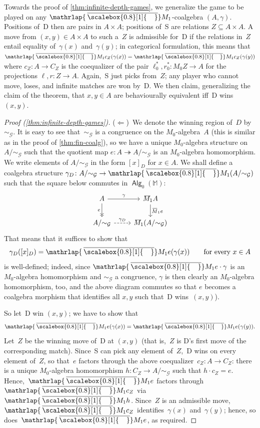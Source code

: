 \documentclass[sigconf,
			final%
			nonacm
                        ]{acmart}
\numberwithin{equation}{section}
\numberwithin{equation}{section}
\theoremstyle{plain}
\theoremstyle{definition}
\newcommand{\overbar}[1]{\mkern 1.5mu\overline{\mkern-2.5mu#1\mkern-1.5mu}\mkern 1.5mu}
\newcommand{\mybar}[3]{%
  \mathrlap{\hspace{#2}\overline{\scalebox{#1}[1]{\hphantom{\ensuremath{#3}}\vphantom{\rule{0pt}{5.5pt}}}}}\ensuremath{#3}
}
\newcommand{\infgameeq}{\sim_{\mathcal{G}}}
\newcommand{\barM}{\mybar{0.8}{2pt}{M}_1}
\newcommand{\epito}{\twoheadrightarrow}
\newcommand{\M}{\mathbb{M}}                   %
\DeclareMathOperator{\Alg}{\mathsf{Alg}}
\begin{document}
Towards the proof of \cref{thm:infinite-depth-games}, we generalize
the game to be played on any $\barM$-coalgebra $(A,\gamma)$. Positions
of~D then are pairs in $A\times A$; positions of~S are relations
$Z\subseteq A\times A$. A move from $(x,y)\in A \times A$ to such
a~$Z$ is admissible for~D if the relations in~$Z$ entail equality
of~$\gamma(x)$ and~$\gamma(y)$; in categorical formulation, this means
that $\barM c_Z(\gamma(x))=\barM c_Z(\gamma(y))$ where
$c_Z\colon A\to C_Z$ is the coequalizer of the pair
$\ell^*_0,r^*_0\colon M_0Z\to A$ for the projections
$\ell,r\colon Z\to A$. Again,~S just picks from~$Z$; any player who
cannot move, loses, and infinite matches are won by~D. We then claim,
generalizing the claim of the theorem, that $x,y\in A$ are
behaviourally equivalent iff~D wins $(x,y)$.

\begin{proof}[Proof (\cref{thm:infinite-depth-games})]
($\Leftarrow$)~We denote the winning region of~$D$ by $\infgameeq$. It is
easy to see that~$\infgameeq$ is a congruence on the $M_0$-algebra~$A$
(this is similar as in the proof of \cref{thm:fin-coalg}),%
so
we have a unique $M_0$-algebra structure on $A/{\infgameeq}$ such that the
quotient map $e\colon A\epito A/{\infgameeq}$ is an $M_0$-algebra
homomorphism. We write elements of $A/{\infgameeq}$ in the form $[x]_D$
for $x\in A$. We shall define a coalgebra structure $\gamma_D\colon
A/{\infgameeq} \to \barM(A/{\infgameeq})$ such that the square below commutes
in $\Alg_0(\M)$:
\[
  \begin{tikzcd}
    A \ar{r}{\gamma}
    \ar[->>]{d}[swap]{e}
    &
    \barM A
    \ar{d}{\overbar M_1 e}
    \\
    A/{\infgameeq}
    \ar[dashed]{r}{\gamma_D}
    &
    \barM(A/{\infgameeq})
  \end{tikzcd}
\]
That means that it suffices to show that
\begin{equation*}
  \gamma_D([x]_D) = \barM e(\gamma(x))\qquad
  \text{for every $x \in A$}
\end{equation*}
is well-defined; indeed, since $\barM e\cdot \gamma$ is an $M_0$-algebra
homomorphism and $\infgameeq$ a congruence, $\gamma$ is then clearly an
$M_0$-algebra homomorphism, too, and the above diagram commutes so
that $e$ becomes a coalgebra morphism that identifies all $x,y$ such
that~D wins~$(x,y)$).

So let~D win $(x,y)$; we have to show that
\[
  \barM e(\gamma(x))=\barM e(\gamma(y)).
\]
Let~$Z$ be the winning move of~D at $(x,y)$ (that is,~$Z$ is D's first
move of the corresponding match). Since~S can pick any element
of~$Z$,~D wins on every element of~$Z$, so that~$e$ factors through
the above coequalizer~$c_Z\colon A \to C_Z$: there is a unique
$M_0$-algebra homomorphism $h\colon C_Z \to A/{\infgameeq}$ such that
$h \cdot c_Z = e$. Hence,~$\barM e$ factors through~$\barM c_Z$ via
$\barM h$. Since~$Z$ is an admissible move, $\barM c_Z$
identifies~$\gamma(x)$ and~$\gamma(y)$; hence, so does~$\barM e$, as
required.%


\end{proof}
\end{document}
